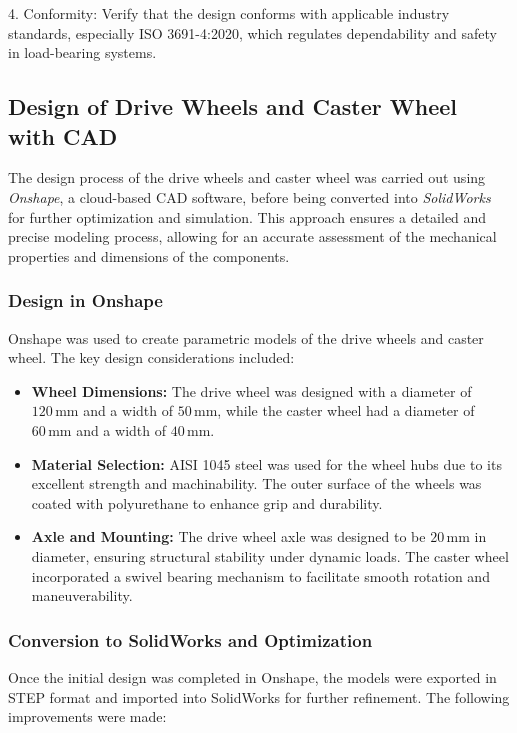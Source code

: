 \documentclass[../../main]{subfiles}
\begin{document}
4. Conformity: Verify that the design conforms with applicable industry
standards, especially ISO 3691-4:2020, which regulates dependability and
safety in load-bearing systems.

\subsection{Design of Drive Wheels and Caster Wheel with CAD}
The design process of the drive wheels and caster wheel was carried out using \emph{Onshape}, a cloud-based CAD software, before being converted into \emph{SolidWorks} for further optimization and simulation. This approach ensures a detailed and precise modeling process, allowing for an accurate assessment of the mechanical properties and dimensions of the components.

\subsubsection{Design in Onshape}
Onshape was used to create parametric models of the drive wheels and caster wheel. The key design considerations included:
\begin{itemize}

\item \textbf{Wheel Dimensions:} The drive wheel was designed with a diameter of $120 \, \mathrm{mm}$ and a width of $50 \, \mathrm{mm}$, while the caster wheel had a diameter of $60 \, \mathrm{mm}$ and a width of $40 \, \mathrm{mm}$.
  
\item \textbf{Material Selection:} AISI 1045 steel was used for the wheel hubs due to its excellent strength and machinability. The outer surface of the wheels was coated with polyurethane to enhance grip and durability.
  
\item \textbf{Axle and Mounting:} The drive wheel axle was designed to be $20 \, \mathrm{mm}$ in diameter, ensuring structural stability under dynamic loads. The caster wheel incorporated a swivel bearing mechanism to facilitate smooth rotation and maneuverability.
  
\end{itemize}

\subsubsection{Conversion to SolidWorks and Optimization}
Once the initial design was completed in Onshape, the models were exported in STEP format and imported into SolidWorks for further refinement. The following improvements were made:
\end{document}
